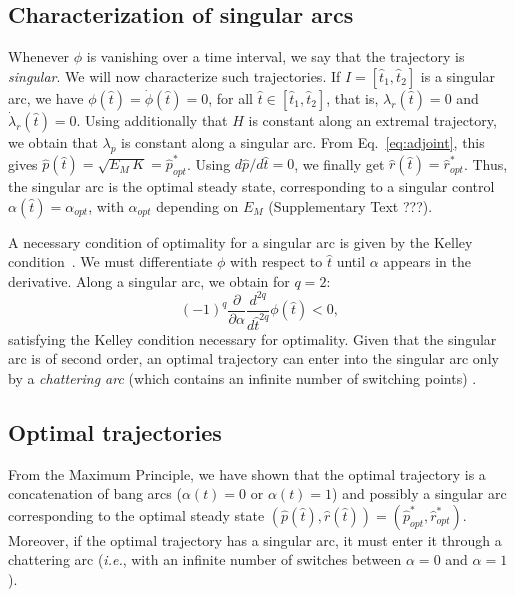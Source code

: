 \subsection{Characterization of singular arcs}

Whenever $\phi$ is vanishing over a time interval, we say that the trajectory is \textit{singular}.
We will now characterize such trajectories.
If $I=[\hat{t}_1,\hat{t}_2]$ is a singular arc, we have $\phi(\hat{t})=\dot{\phi}(\hat{t})=0$, for all $\hat{t}\in[\hat{t}_1,\hat{t}_2]$, that is, $\lambda_r(\hat{t})=0$ and $\dot\lambda_r(\hat{t})=0$. Using additionally that $H$ is constant along an extremal trajectory, we obtain that $\lambda_p$ is constant along a singular arc. From Eq.~\ref{eq:adjoint}, this gives $\hat{p}(\hat{t})=\sqrt{E_M\, K}=\hat{p}_{opt}^*$. Using $d\hat{p}/d\hat{t}=0$, we finally get $\hat{r}(\hat{t})=\hat{r}_{opt}^*$.
Thus, the singular arc is the optimal steady state, corresponding to a singular control $\alpha(\hat{t})=\alpha_{opt}$, with $\alpha_{opt}$ depending on $E_M$ (Supplementary Text ???).

A necessary condition of optimality for a singular arc is given by the Kelley condition~\cite{borisov_fullers_2000}.
We must differentiate $\phi$ with respect to $\hat{t}$ until $\alpha$ appears in the derivative. Along a singular arc, we obtain for $q=2$:
$$
(-1)^q\frac{\partial}{\partial\alpha}\frac{d^{2q}}{d\hat{t}^{2q}}\phi(\hat{t})<0,
$$
satisfying the Kelley condition necessary for optimality. Given that the singular arc is of second order, an optimal trajectory can enter into the singular arc only by a \textit{chattering arc} (which contains an infinite number of switching points) \cite{marchal_chattering_2013,borisov_fullers_2000}. 

\subsection{Optimal trajectories}

From the Maximum Principle, we have shown that the optimal trajectory is a concatenation of bang arcs ($\alpha(t)=0$ or $\alpha(t)=1$) and possibly a singular arc corresponding to the optimal steady state $(\hat{p}(\hat{t}),\hat{r}(\hat{t}))=(\hat{p}_{opt}^*,\hat{r}_{opt}^*)$. Moreover, if the optimal trajectory has a singular arc, it must enter it through a chattering arc (\textit{i.e.}, with an infinite number of switches between $\alpha=0$ and $\alpha=1$).

